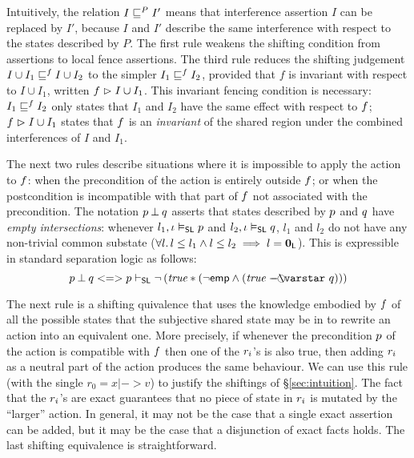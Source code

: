 %
Intuitively, the relation $	I \sqsubseteq^{P} I'	$
means that  interference assertion $I$ can be replaced by $I'$,
because $I$ and $I'$ describe the same interference with respect to the
states described by $P$. The first rule weakens the shifting condition
from assertions to local fence assertions. 
The third rule reduces the  shifting judgement $I \cup I_1
\weakenI{\fenceAss{}} I \cup I_2$ to the simpler $I_1
\weakenI{\fenceAss{}} I_2$, provided that $f$ is invariant with
respect to $I\cup I_1$, written $f \mathrel{\rhd} I\cup I_1$.
This invariant fencing condition is necessary: 
$I_1 \weakenI{\fenceAss{}}
I_2$ only states that $I_1$ and $I_2$ have the same effect with
respect to  $\lass{F}$;  $f \mathrel{\rhd} I\cup I_1$
states that $\lass{F}$ is an \emph{invariant} of the shared region
under the combined interferences of $I$ and $I_1$. 


The next two rules describe situations where  it is impossible to apply the
action to $\lass{F}$: when the precondition  of the action is
entirely outside  $\lass{F}$; or when the postcondition is
incompatible  with that part of  $\lass{F} $ not associated with the
precondition. 
The notation $\separate{\lass{P}}{\lass{Q}}$ asserts that
states described by $\lass{P}$ and $\lass{Q}$ have \emph{empty
  intersections}: whenever $l_1, \lenv \slsat \lass{P}$ and $l_2,
\lenv \slsat \lass{Q}$, $l_1$ and $l_2$ do not have any non-trivial
common substate ($\forall l.\, l \leq l_1 \land l \leq l_2 \implies l =
\mathbf{0}_{\mathsf{L}}$). This is expressible in standard separation logic as follows:
\[
\separate{\lass{P}}{\lass{Q}} <=> \lass{P} \slentails \neg\left( \m{true} * (\neg\emp \land (\m{true} \septraction \lass{Q}) ) \right)
\]

The next rule is a shifting quivalence that uses the
knowledge embodied by $\lass{F}$ of all the possible states that the
subjective shared state may be in to rewrite an action into an
equivalent one. More precisely, if whenever the precondition
$\lass{P}$ of the action is compatible with $\lass{F}$ then one of the
$\lass{R}_i$'s is also true, then adding $\lass{R}_i$ as a neutral
part of the action produces the same behaviour. We can use this rule
(with the single $r_0 = x|->v$) to justify the shiftings of
\S\ref{sec:intuition}. The fact that the $\lass{R}_i$'s are exact
guarantees that no piece of state in $\lass{R}_i$ is mutated by the
``larger'' action.  In general, it may not be the case that a
single exact assertion can be added, but it may be the case that a
disjunction of exact facts holds. The last shifting equivalence is
straightforward.

